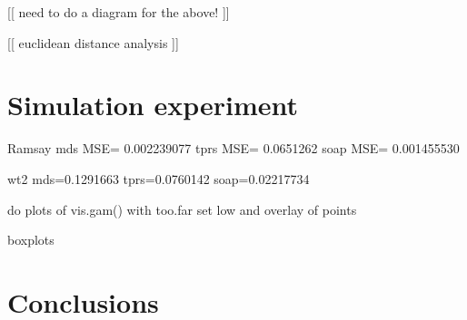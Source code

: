 \documentclass[a4paper,10pt]{amsart}
\begin{document}
[[ need to do a diagram for the above! ]]



[[ euclidean distance analysis ]]
\section{Simulation experiment}

Ramsay
mds MSE= 0.002239077 
tprs MSE= 0.0651262 
soap MSE= 0.001455530 


wt2
mds=0.1291663
tprs=0.0760142
soap=0.02217734



do plots of vis.gam() with too.far set low and overlay of points

boxplots



\section{Conclusions}




\end{document}
